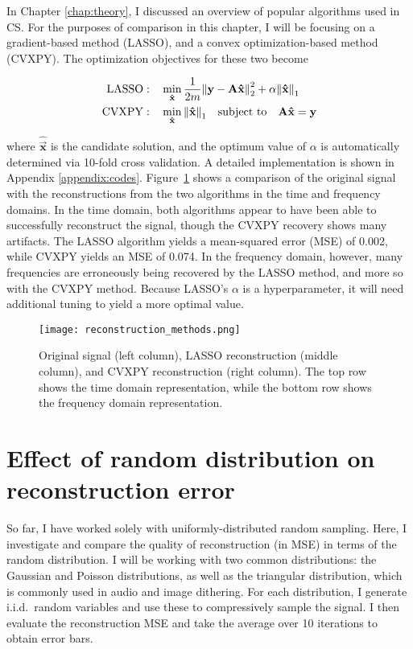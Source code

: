 In Chapter \ref{chap:theory}, I discussed an overview of popular algorithms used in CS. For the purposes of comparison in this chapter, I will be focusing on a gradient-based method (LASSO), and a convex optimization-based method (CVXPY). The optimization objectives for these two become

\begin{align}
\mathrm{LASSO}:& \quad \min_{\bm\hat{\text{\bfseries x}}} \frac{1}{2m} \norm{\text{\bfseries y} - \text{\bfseries A}\bm\hat{\text{\bfseries x}}}_2^2 + \alpha \norm{\bm\hat{\text{\bfseries x}}}_1 \label{eq:random-lasso-objective} \\
\mathrm{CVXPY}:& \quad \min_{\bm\hat{\text{\bfseries x}}} \norm{\bm\hat{\text{\bfseries x}}}_1 \quad \textrm{subject to} \quad \text{\bfseries A}\bm\hat{\text{\bfseries x}} = \text{\bfseries y} \label{eq:random-cvxpy-objective}
\end{align}

\noindent where $\bm\hat{\vec{x}}$ is the candidate solution, and the optimum value of $\alpha$ is automatically determined via 10-fold cross validation. A detailed implementation is shown in Appendix \ref{appendix:codes}. Figure~\ref{fig:random-compare-algorithms} shows a comparison of the original signal with the reconstructions from the two algorithms in the time and frequency domains. In the time domain, both algorithms appear to have been able to successfully reconstruct the signal, though the CVXPY recovery shows many artifacts. The LASSO algorithm yields a mean-squared error (MSE) of 0.002, while CVXPY yields an MSE of 0.074. In the frequency domain, however, many frequencies are erroneously being recovered by the LASSO method, and more so with the CVXPY method. Because LASSO's $\alpha$ is a hyperparameter, it will need additional tuning to yield a more optimal value.

\begin{figure}[htb]
	\texttt{[image: reconstruction\_methods.png]}
	\caption{Original signal (left column), LASSO reconstruction (middle column), and CVXPY reconstruction (right column). The top row shows the time domain representation, while the bottom row shows the frequency domain representation.}
	\label{fig:random-compare-algorithms}
\end{figure}


\section{Effect of random distribution on reconstruction error}
\label{sec:random-distro}
So far, I have worked solely with uniformly-distributed random sampling. Here, I investigate and compare the quality of reconstruction (in MSE) in terms of the random distribution. I will be working with two common distributions: the Gaussian and Poisson distributions, as well as the triangular distribution, which is commonly used in audio and image dithering. For each distribution, I generate i.i.d.~random variables and use these to compressively sample the signal. I then evaluate the reconstruction MSE and take the average over 10 iterations to obtain error bars.


